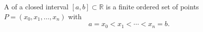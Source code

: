 A  of a closed interval $[a, b] \subset \mathbb{R}$ is a finite ordered set of points $P = (x_0, x_1, \ldots, x_n)$ with
$$a = x_0 < x_1 < \cdots < x_n = b.$$
